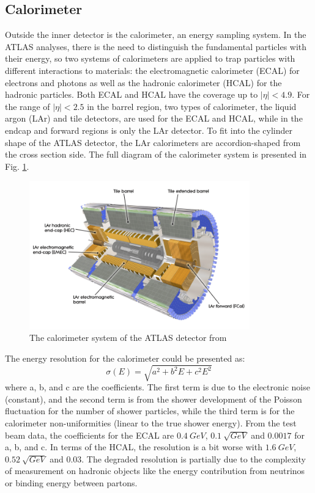 \subsection{Calorimeter}
Outside the inner detector is the calorimeter, an energy sampling system. In the ATLAS analyses, there is the need to distinguish the fundamental particles with their energy, so two systems of calorimeters are applied to trap particles with different interactions to materials: the electromagnetic calorimeter (ECAL) for electrons and photons as well as the hadronic calorimeter (HCAL) for the hadronic particles. Both ECAL and HCAL have the coverage up to $|\eta|<4.9$. For the range of $|\eta|<2.5$ in the barrel region, two types of calorimeter, the liquid argon (LAr) and tile detectors, are used for the ECAL and HCAL, while in the endcap and forward regions is only the LAr detector. To fit into the cylinder shape of the ATLAS detector, the LAr calorimeters are accordion-shaped from the cross section side. The full diagram of the calorimeter system is presented in Fig. \ref{Fig:calorimeter}. 
\begin{figure}[!h]                %
	\includegraphics[width=0.85\textwidth]{Chapter2/calorimeter}
	\centering
	\begin{center}
		\caption{The calorimeter system of the ATLAS detector from \cite{Aad:2008zzm}}
		\label{Fig:calorimeter}            
	\end{center}
\end{figure}
The energy resolution for the calorimeter could be presented as:
\begin{equation}
\sigma (E)=\sqrt{a^{2}+b^{2}E+c^{2}E^{2}}
\end{equation}
where a, b, and c are the coefficients. The first term is due to the electronic noise (constant), and the second term is from the shower development of the Poisson fluctuation for the number of shower particles, while the third term is for the calorimeter non-uniformities (linear to the true shower energy). From the test beam data, the coefficients for the ECAL are $0.4~GeV$, $0.1~\sqrt{GeV}$ and $0.0017$ for a, b, and c. In terms of the HCAL, the resolution is a bit worse with $1.6~GeV$, $0.52~\sqrt{GeV}$ and $0.03$. The degraded resolution is partially due to the complexity of measurement on hadronic objects like the energy contribution from neutrinos or binding energy between partons. 
